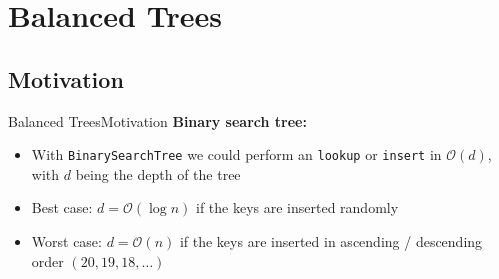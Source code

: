 \section{Balanced Trees}

\subsection{Motivation}

\begin{frame}{Balanced Trees}{Motivation}
  \textbf{Binary search tree:}
  \begin{itemize}
    \item
      With \texttt{\color{Mittel-Blau}BinarySearchTree} we could perform an
      \texttt{\color{Mittel-Blau}lookup} or
      \texttt{\color{Mittel-Blau}insert} in $\mathcal{O}(d)$, with $d$ being
      the {\color{Mittel-Blau}depth} of the tree
    \item
      {\color{Mittel-Blau}Best case}:
      $d = \mathcal{O}(\log n)$ if the keys are inserted randomly
    \item
      {\color{Mittel-Blau}Worst case}:
      $d = \mathcal{O}(n)$ if the keys are inserted in ascending / descending
      order $(20, 19, 18, \dotsc)$
  \end{itemize}
\end{frame}


